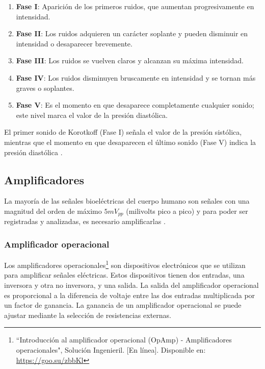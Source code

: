        \begin{enumerate}
            \item \textbf{Fase I}: Aparición de los primeros ruidos, que aumentan progresivamente en intensidad.
            \item \textbf{Fase II}: Los ruidos adquieren un carácter soplante y pueden disminuir en intensidad o desaparecer brevemente.
            \item \textbf{Fase III}: Los ruidos se vuelven claros y alcanzan su máxima intensidad.
            \item \textbf{Fase IV}: Los ruidos disminuyen bruscamente en intensidad y se tornan más graves o soplantes.
            \item \textbf{Fase V}: Es el momento en que desaparece completamente cualquier sonido; este nivel marca el valor de la presión diastólica.
        \end{enumerate}

        El primer sonido de Korotkoff (Fase I) señala el valor de la presión sistólica, mientras que el momento en que desaparecen el último sonido (Fase V) indica la presión diastólica \cite{Gill_2018}. 


    \subsection{Amplificadores}
    La mayoría de las señales bioeléctricas del cuerpo humano son señales con una magnitud del orden de máximo $5 mV_{pp}$ (milivolts pico a pico) y para poder ser registradas y analizadas, es necesario amplificarlas \cite{Diaz_amplificacion_señales}.

        \subsubsection{Amplificador operacional}
            Los amplificadores operacionales\footnote{``Introducción al amplificador operacional (OpAmp) - Amplificadores operacionales", Solución Ingenieril. [En línea]. Disponible en: \url{https://goo.su/zbbKl}} son dispositivos electrónicos que se utilizan para amplificar señales eléctricas. Estos dispositivos tienen dos entradas, una inversora y otra no inversora, y una salida. La salida del amplificador operacional es proporcional a la diferencia de voltaje entre las dos entradas multiplicada por un factor de ganancia. La ganancia de un amplificador operacional se puede ajustar mediante la selección de resistencias externas.

